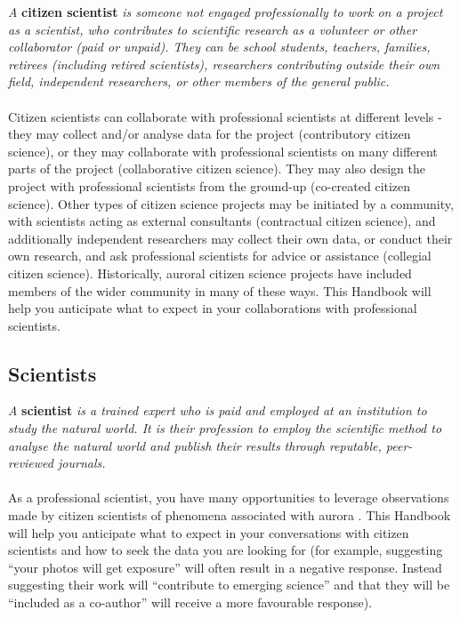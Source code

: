 \documentclass{article}
\begin{document}
\textit{A} \textbf{citizen scientist} \textit{is someone not engaged professionally to work on a project as a scientist, who contributes to scientific research as a volunteer or other collaborator (paid or unpaid). They can be school students, teachers, families, retirees (including retired scientists), researchers contributing outside their own field, independent researchers, or other members of the general public.}\\
\\
Citizen scientists can collaborate with professional scientists at different levels - they may collect and/or analyse data for the project (contributory citizen science), or they may collaborate with professional scientists on many different parts of the project (collaborative citizen science). They may also design the project with professional scientists from the ground-up (co-created citizen science). Other types of citizen science projects may be initiated by a community, with scientists acting as external consultants (contractual citizen science), and additionally independent researchers may collect their own data, or conduct their own research, and ask professional scientists for advice or assistance (collegial citizen science). Historically, auroral citizen science projects have included members of the wider community in many of these ways. This Handbook will help you anticipate what to expect in your collaborations with professional scientists.

\subsection{Scientists}

\textit{A} \textbf{scientist} \textit{is a trained expert who is paid and employed at an institution to study the natural world. It is their profession to employ the scientific method to analyse the natural world and publish their results through reputable, peer-reviewed journals.}\\
\\
As a professional scientist, you have many opportunities to leverage observations made by citizen scientists of phenomena associated with aurora . This Handbook will help you anticipate what to expect in your conversations with citizen scientists and how to seek the data you are looking for (for example, suggesting ``your photos will get exposure'' will often result in a negative response. Instead suggesting their work will ``contribute to emerging science'' and that they will be ``included as a co-author'' will receive a more favourable response).
\end{document}
